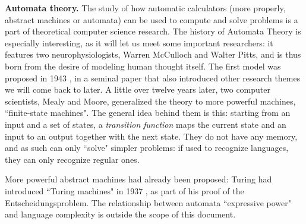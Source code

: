 \documentclass[../main.tex]{subfiles}
\begin{document}
\vspace{4pt}
\textbf{Automata theory.}
The study of how automatic calculators (more properly, abstract machines or automata) can be used to compute and solve problems is a part of theoretical computer science research. The history of Automata Theory is especially interesting, as it will let us meet some important researchers: it features two neurophysiologists, Warren McCulloch and Walter Pitts, and is thus born from the desire of modeling human thought itself. The first model was proposed in 1943 \cite{mccullochLogicalCalculusIdeas1943}, in a seminal paper that also introduced other research themes we will come back to later. A little over twelve years later, two computer scientists, Mealy and Moore, generalized the theory to more powerful machines, ``finite-state machines". The general idea behind them is this: starting from an input and a set of states, a \textit{transition function} maps the current state and an input to an output together with the next state. They do not have any memory, and as such can only ``solve" simpler problems: if used to recognize languages, they can only recognize regular ones.

More powerful abstract machines had already been proposed: Turing had introduced ``Turing machines" in 1937 \cite{turingComputableNumbersApplication1937}, as part of his proof of the Entscheidungsproblem. The relationship between automata ``expressive power" and language complexity is outside the scope of this document.
\end{document}
